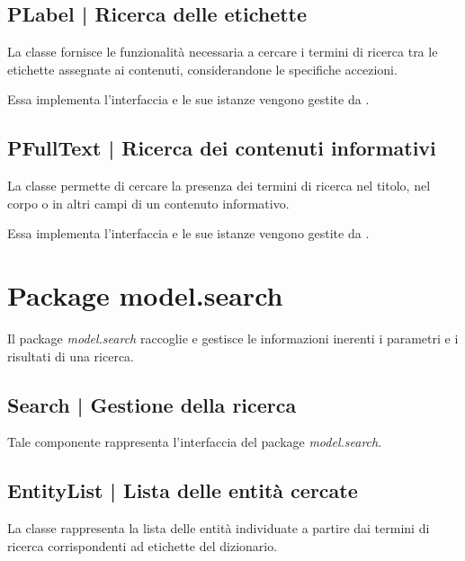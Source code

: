 \documentclass[10pt,a4paper,headinclude,footinclude,hidelinks]{scrreprt} %
\begin{document}
	\subsection[PLabel]{PLabel | Ricerca delle etichette}
	\label{sec:stage:design:sistema:model.search:tag-provider}
	La classe \textit{} fornisce le funzionalità necessaria a cercare i termini di ricerca tra le etichette assegnate ai contenuti, considerandone le specifiche accezioni.

	Essa implementa l'interfaccia \textit{} e le sue istanze vengono gestite da \textit{}.

	\subsection[PFullText]{PFullText | Ricerca dei contenuti informativi}
	\label{sec:stage:design:sistema:model.search:full-text-provider}
	La classe \textit{} permette di cercare la presenza dei termini di ricerca nel titolo, nel corpo o in altri campi di un contenuto informativo.

	Essa implementa l'interfaccia \textit{} e le sue istanze vengono gestite da \textit{}.

	\section{Package model.search}
	\label{sec:stage:design:sistema:model.search}
	Il package \textit{model.search} raccoglie e gestisce le informazioni inerenti i parametri e i risultati di una ricerca. 

	\subsection[Search]{Search | Gestione della ricerca}
	\label{sec:stage:design:sistema:model.search:search}
	Tale componente rappresenta l'interfaccia del package \textit{model.search}.

	\subsection[EntityList]{EntityList | Lista delle entità cercate}
	\label{sec:stage:design:sistema:model.search:search-entity-list}
	La classe \textit{} rappresenta la lista delle entità individuate a partire dai termini di ricerca corrispondenti ad etichette del dizionario.
\end{document}
